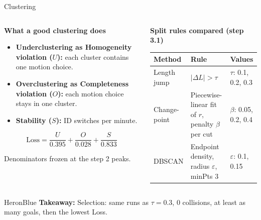 \documentclass[aspectratio=169,11pt]{beamer}
\newcommand{\takeaway}[1]{%
  \begin{statusbox}{HeronBlue}
    \footnotesize\textbf{Takeaway:} #1
  \end{statusbox}
}
\begin{document}
\begin{frame}{Clustering}
  \begin{columns}[T,totalwidth=\textwidth]
    \begin{column}{0.47\textwidth}
      \footnotesize
      \textbf{\textcolor{HeronBlue}{What a good clustering does}}
      \begin{itemize}\setlength{\itemsep}{3pt}
        \item \textbf{Underclustering as Homogeneity violation ($U$):} each cluster contains one motion choice.
        \item \textbf{Overclustering as Completeness violation ($O$):} each motion choice stays in one cluster.
        \item \textbf{Stability ($S$):} ID switches per minute.
      \end{itemize}
      \vspace{0.1cm}
      \[
        \mathrm{Loss} = \frac{U}{0.395} + \frac{O}{0.028} + \frac{S}{0.833}
      \]
      {\scriptsize Denominators frozen at the step 2 peaks.\par}
    \end{column}
    \begin{column}{0.50\textwidth}
      \footnotesize
      \textbf{\textcolor{HeronBlue}{Split rules compared (step 3.1)}}\par\vspace{0.12cm}
      \renewcommand{\arraystretch}{1.25}
      \begin{tabularx}{\linewidth}{@{}L{1.85cm}YL{1.45cm}@{}}
        \toprule
        \textbf{Method} & \textbf{Rule} & \textbf{Values}\\
        \midrule
        Length jump & $|\Delta L| > \tau$ & $\tau$: 0.1, 0.2, 0.3\\
        Change-point & Piecewise-linear fit of $r$, penalty $\beta$ per cut & $\beta$: 0.05, 0.2, 0.4\\
        DBSCAN & Endpoint density, radius $\varepsilon$, minPts 3 & $\varepsilon$: 0.1, 0.15\\
        \bottomrule
      \end{tabularx}
    \end{column}
  \end{columns}
  \vspace{0.2cm}
  \takeaway{Selection: same runs as $\tau=0.3$, 0 collisions, at least as many goals, then the lowest Loss.}
\end{frame}
\end{document}
